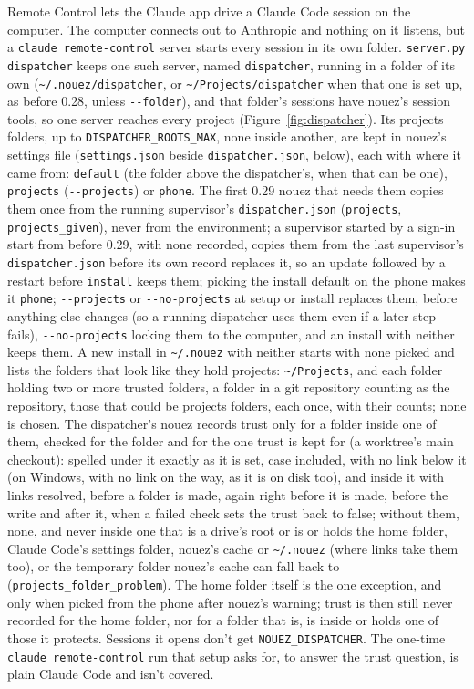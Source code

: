 \documentclass[10pt,a4paper]{article}
\newcommand{\code}[1]{\texttt{#1}}
\begin{document}
Remote Control lets the Claude app drive a Claude Code session on the computer. The computer
connects out to Anthropic and nothing on it listens, but a \code{claude remote-control} server
starts every session in its own folder. \code{server.py dispatcher} keeps one such server, named
\code{dispatcher}, running in a folder of its own (\code{\textasciitilde/.nouez/dispatcher}, or
\code{\textasciitilde/Projects/dispatcher} when that one is set up, as before 0.28, unless
\code{-{}-folder}), and that folder's sessions have nouez's session tools, so one server reaches
every project (Figure~\ref{fig:dispatcher}). Its projects folders, up to \code{DISPATCHER\_ROOTS\_MAX},
none inside another, are kept in nouez's settings file (\code{settings.json} beside \code{dispatcher.json}, below), each with where it came from: \code{default} (the folder above the dispatcher's, when
that can be one), \code{projects} (\code{-{}-projects}) or \code{phone}. The first 0.29 nouez that needs
them copies them once from the running supervisor's \code{dispatcher.json} (\code{projects},
\code{projects\_given}), never from the environment; a supervisor started by a sign-in start from before
0.29, with none recorded, copies them from the last supervisor's \code{dispatcher.json} before its own
record replaces it, so an update followed by a restart before \code{install} keeps them; picking the
install default on the phone makes it \code{phone}; \code{-{}-projects} or \code{-{}-no-projects} at
setup or install replaces them, before anything else changes (so a running dispatcher uses them even if a
later step fails), \code{-{}-no-projects} locking them to the computer, and an install with
neither keeps them. A new install in \code{\textasciitilde/.nouez} with neither starts with none picked
and lists the folders that look like they hold projects: \code{\textasciitilde/Projects}, and each
folder holding two or more trusted folders, a folder in a git repository counting as the repository,
those that could be projects folders, each once, with their counts; none is chosen. The dispatcher's
nouez records trust only for a folder inside one of them, checked for the folder and for the one trust is
kept for (a worktree's main checkout): spelled under it exactly as it is set, case included, with no
link below it (on Windows, with no link on the way, as it is on disk too), and inside it with links
resolved, before a folder is made, again right before it is made, before the write and after it, when
a failed check sets the trust back to false; without them, none, and never inside one that is a
drive's root or is or holds the home folder, Claude Code's settings folder, nouez's cache or
\code{\textasciitilde/.nouez} (where links take them too), or the temporary folder nouez's cache can
fall back to (\code{projects\_folder\_problem}). The home folder itself is the one exception, and only
when picked from the phone after nouez's warning; trust is then still never recorded for the home
folder, nor for a folder that is, is inside or holds one of those it protects. Sessions it opens don't
get \code{NOUEZ\_DISPATCHER}. The one-time \code{claude remote-control} run that setup asks for, to
answer the trust question, is plain Claude Code and isn't covered.
\end{document}
